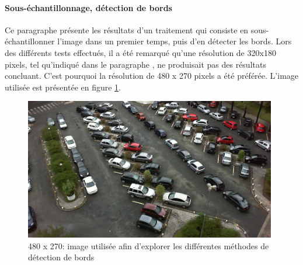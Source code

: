 \paragraph{Sous-échantillonnage, détection de bords}\label{conception.traitement.eval.down-edge}
Ce paragraphe présente les résultats d'un traitement qui consiste en sous-échantillonner l'image dans un premier temps, puis d'en détecter les bords. Lors des différents tests effectués, il a été remarqué qu'une résolution de 320x180 pixels, tel qu'indiqué dans le paragraphe , ne produisait pas des résultats concluant. C'est pourquoi la résolution de 480 x 270 pixels a été préférée. L'image utilisée est présentée en figure \ref{fig:image_process_down_edge_orig}.

\begin{figure}[H]
    \includegraphics[width=110mm]{img/conception/image_process/downsample_only/2.png}
    \centering
    \caption{480 x 270: image utilisée afin d'explorer les différentes méthodes de détection de bords}
    \label{fig:image_process_down_edge_orig}
\end{figure}

